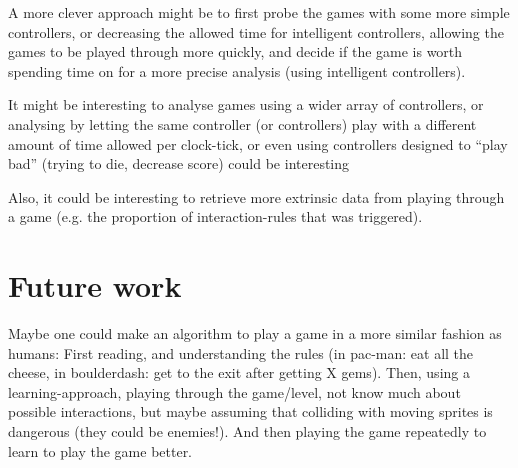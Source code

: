 \documentclass[a4paper,titlepage,final]{report}
\begin{document}
A more clever approach might be to first probe the games with some more simple controllers, or decreasing the allowed time for intelligent controllers, allowing the games to be played through more quickly, and decide if the game is worth spending time on for a more precise analysis (using intelligent controllers).

It might be interesting to analyse games using a wider array of controllers, or analysing by letting the same controller (or controllers) play with a different amount of time allowed per clock-tick, or even using controllers designed to ``play bad'' (trying to die, decrease score) could be interesting

Also, it could be interesting to retrieve more extrinsic data from playing through a game (e.g. the proportion of interaction-rules that was triggered).


\section{Future work}

Maybe one could make an algorithm to play a game in a more similar fashion as humans:
First reading, and understanding the rules (in pac-man: eat all the cheese, in boulderdash: get to the exit after getting X gems).
Then, using a learning-approach, playing through the game/level, not know much about possible interactions, but maybe assuming that colliding with moving sprites is dangerous (they could be enemies!).
And then playing the game repeatedly to learn to play the game better.





\end{document}
